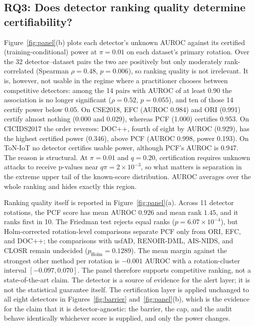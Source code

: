 \documentclass[a4paper,fleqn]{cas-dc}
\begin{document}
\subsection{RQ3: Does detector ranking quality determine certifiability?}
\label{sec:rq3}
Figure~\ref{fig:panel}(b) plots each detector's unknown AUROC against its certified (training-conditional) power at $\pi=0.01$ on each dataset's primary rotation. Over the 32 detector--dataset pairs the two are positively but only moderately rank-correlated (Spearman $\rho=0.48$, $p=0.006$), so ranking quality is not irrelevant. It is, however, not usable in the regime where a practitioner chooses between competitive detectors: among the 14 pairs with AUROC of at least 0.90 the association is no longer significant ($\rho=0.52$, $p=0.055$), and ten of those 14 certify power below 0.05. On CSE2018, EFC (AUROC 0.984) and ORI (0.991) certify almost nothing (0.000 and 0.029), whereas PCF (1.000) certifies 0.953. On CICIDS2017 the order reverses: DOC++, fourth of eight by AUROC (0.929), has the highest certified power (0.346), above PCF (AUROC 0.998, power 0.193). On ToN-IoT no detector certifies usable power, although PCF's AUROC is 0.947. The reason is structural. At $\pi=0.01$ and $q=0.20$, certification requires unknown attacks to receive p-values near $q\pi=2\times10^{-3}$, so what matters is separation in the extreme upper tail of the known-score distribution. AUROC averages over the whole ranking and hides exactly this region.

Ranking quality itself is reported in Figure~\ref{fig:panel}(a). Across 11 detector rotations, the PCF score has mean AUROC $0.926$ and mean rank $1.45$, and it ranks first in 10. The Friedman test rejects equal ranks ($p=6.07\times10^{-4}$), but Holm-corrected rotation-level comparisons separate PCF only from ORI, EFC, and DOC++; the comparisons with usfAD, RENOIR-DML, AIS-NIDS, and CLOSR remain undecided ($p_{\mathrm{Holm}}=0.1289$). The mean margin against the strongest other method per rotation is $-0.001$ AUROC with a rotation-cluster interval $[-0.097,0.070]$. The panel therefore supports competitive ranking, not a state-of-the-art claim. The detector is a source of evidence for the alert layer; it is not the statistical guarantee itself. The certification layer is applied unchanged to all eight detectors in Figures~\ref{fig:barrier} and~\ref{fig:panel}(b), which is the evidence for the claim that it is detector-agnostic: the barrier, the cap, and the audit behave identically whichever score is supplied, and only the power changes.
\end{document}
